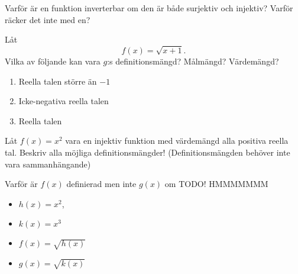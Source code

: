 \begin{problem}
	Varför är en funktion inverterbar om den är både surjektiv och injektiv? Varför räcker det inte med en?
\end{problem}



\begin{problem}
	Låt
	\[
		f(x) = \sqrt{x + 1}.
	\]
	Vilka av följande kan vara \(g\):s definitionsmängd? Målmängd? Värdemängd?
	\begin{enumerate}
		\item Reella talen större än \(-1\) 
		\item Icke-negativa reella talen
		\item Reella talen
	\end{enumerate}
\end{problem}

\begin{problem}
	Låt \(f(x) = x^2\) vara en injektiv funktion med värdemängd alla positiva reella tal. Beskriv alla möjliga definitionsmängder! (Definitionsmängden behöver inte vara sammanhängande)
\end{problem}



\begin{problem}
	Varför är \(f(x)\) definierad men inte \(g(x)\) om TODO! HMMMMMMM
	\begin{itemize}
		\item \(h(x) = x^2\),
		\item \(k(x) = x^3\) 
		\item \(f(x) = \sqrt{h(x)}\)  
		\item \(g(x) = \sqrt{k(x)}\)  
	\end{itemize}
\end{problem}

